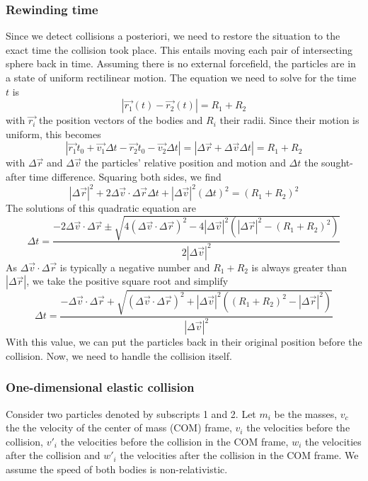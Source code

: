\subsubsection{Rewinding time}
Since we detect collisions a posteriori, we need to restore the situation to 
the exact time the collision took place. This entails moving each pair of 
intersecting sphere back in time. Assuming there is no external forcefield, the 
particles are in a state of uniform rectilinear motion. The equation we need to 
solve for the time $t$ is
$$
|\vec{r_1}(t) - \vec{r_2}(t)| = R_1 + R_2
$$
with $\vec{r_i}$ the position vectors of the bodies and $R_i$ their radii.  
Since their motion is uniform, this becomes
$$
|\vec{r_1}{t_0} + \vec{v_1}\Delta t - \vec{r_2}{t_0} - \vec{v_2}\Delta t| = | 
\Delta\vec{r} + \Delta\vec{v} \Delta t | = R_1 + R_2
$$
with $\Delta\vec{r}$ and $\Delta\vec{v}$ the particles' relative position and 
motion and $\Delta t$ the sought-after time difference. Squaring both sides, we 
find
$$
|\Delta\vec{r}|^2 + 2\Delta\vec{v} \cdot \Delta\vec{r}\Delta t + 
|\Delta\vec{v}|^2(\Delta t)^2 = (R_1 + R_2)^2
$$
The solutions of this quadratic equation are
$$
\Delta t = \frac{-2\Delta\vec{v} \cdot \Delta\vec{r}
\pm \sqrt{4( \Delta\vec{v} \cdot \Delta\vec{r})^2 -
4|\Delta\vec{v}|^2 \left( |\Delta\vec{r}|^2 - (R_1 + R_2)^2 \right) }}
{2|\Delta\vec{v}|^2}
$$
As $\Delta\vec{v} \cdot \Delta\vec{r}$ is typically a negative number and 
$R_1 + R_2$ is always greater than $|\Delta\vec{r}|$, we take the positive 
square root and simplify
$$
\Delta t=\frac{-\Delta\vec{v} \cdot \Delta\vec{r} +
\sqrt{(\Delta\vec{v} \cdot \Delta\vec{r})^2 + |\Delta\vec{v}|^2
((R_1+R_2)^2 -|\Delta\vec{r}|^2)}}
{|\Delta\vec{v}|^2}
$$
With this value, we can put the particles back in their original position 
before the collision. Now, we need to handle the collision itself.

\subsubsection{One-dimensional elastic collision}

Consider two particles denoted by subscripts 1 and 2.  Let $m_i$ be the masses, 
$v_c$ the the velocity of the center of mass (COM) frame, $v_i$ the velocities 
before the collision, $v'_i$ the velocities before the collision in the COM 
frame, $w_i$ the velocities after the collision and $w'_i$ the velocities after 
the collision in the COM frame.  We assume the speed of both bodies is 
non-relativistic. 

